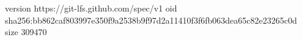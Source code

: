 version https://git-lfs.github.com/spec/v1
oid sha256:bb862caf803997e350f9a2538b9f97d2a11410f3f6fb063dea65c82e23265c0d
size 309470
